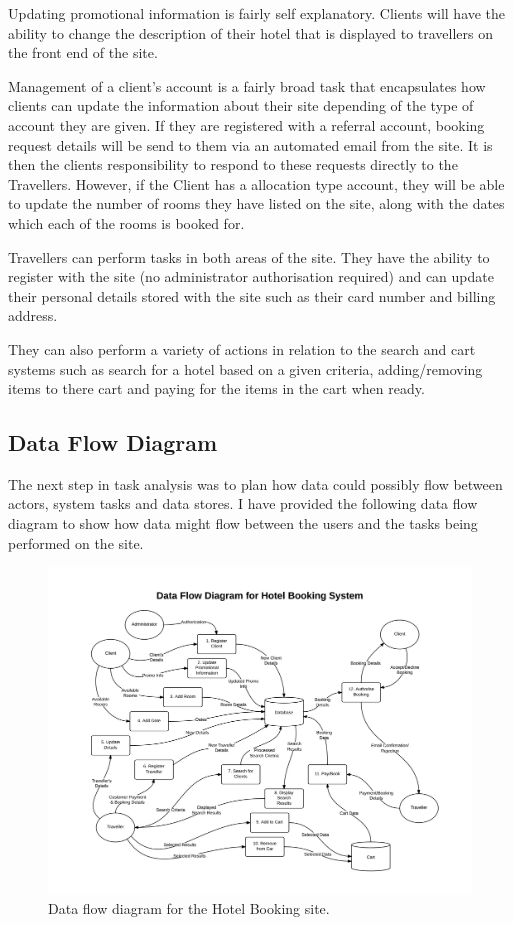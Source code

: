 \documentclass{article}
\begin{document}
Updating promotional information is fairly self explanatory. Clients will have the ability to change the description of their hotel that is displayed to travellers on the front end of the site.

Management of a client's account is a fairly broad task that encapsulates how clients can update the information about their site depending of the type of account they are given. If they are registered with a referral account, booking request details will be send to them via an automated email from the site. It is then the clients responsibility to respond to these requests directly to the Travellers. However, if the Client has a allocation type account, they will be able to update the number of rooms they have listed on the site, along with the dates which each of the rooms is booked for.

Travellers can perform tasks in both areas of the site. They have the ability to register with the site (no administrator authorisation required) and can update their personal details stored with the site such as their card number and billing address.

They can also perform a variety of actions in relation to the search and cart systems such as search for a hotel based on a given criteria, adding/removing items to there cart and paying for the items in the cart when ready.

\subsection{Data Flow Diagram}
The next step in task analysis was to plan how data could possibly flow between  actors, system tasks and data stores. I have provided the following data flow diagram to show how data might flow between the users and the tasks being performed on the site.

\begin{landscape}
\begin{figure}[H]
\centering
\includegraphics[angle=0, width=1\textwidth]{img/dataflow.png}
\caption{Data flow diagram for the Hotel Booking site.}
\label{fig:data-flow}
\end{figure}
\end{landscape}
\end{document}
